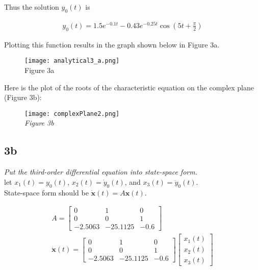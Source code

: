 \documentclass[10pt, AMS Euler]{article}
\begin{document}
Thus the solution $y_0(t)$ is 

\begin{center}
    \begin{align*}
        y_0(t) = 1.5e^{-0.1t} - 0.43e^{-0.25t}\cos{(5t + \frac{\pi}{2})}
    \end{align*}
\end{center}

Plotting this function results in the graph shown below in Figure 3a.
\begin{figure}[H]
    \centering
    \texttt{[image: analytical3\_a.png]}\\
    Figure 3a
\end{figure}

Here is the plot of the roots of the characteristic equation on the complex plane (Figure 3b):

\begin{figure}[H]
    \centering
    \texttt{[image: complexPlane2.png]}\\
    \textit{Figure 3b}
\end{figure}

\subsection*{3b}
\textit{Put the third-order differential equation into state-space form.
}\\

let $x_1(t) = y_0(t)$, $x_2(t) = \dot{y}_0(t)$, and $x_3(t) = \ddot{y}_0(t)$.\\

State-space form should be $\dot{\boldsymbol{x}}(t) = A\boldsymbol{x}(t)$.

\begin{center}
    \begin{align*}
        A = \begin{bmatrix}
        0 & 1 & 0\\
        0 & 0 & 1\\
        -2.5063 & -25.1125 & -0.6
        \end{bmatrix}\\
        \dot{\boldsymbol{x}}(t) = 
        \begin{bmatrix}
        0 & 1 & 0\\
        0 & 0 & 1\\
        -2.5063 & -25.1125 & -0.6
        \end{bmatrix}
        \begin{bmatrix}
        x_1(t)\\
        x_2(t)\\
        x_3(t)
        \end{bmatrix}
    \end{align*}
\end{center}
\end{document}

